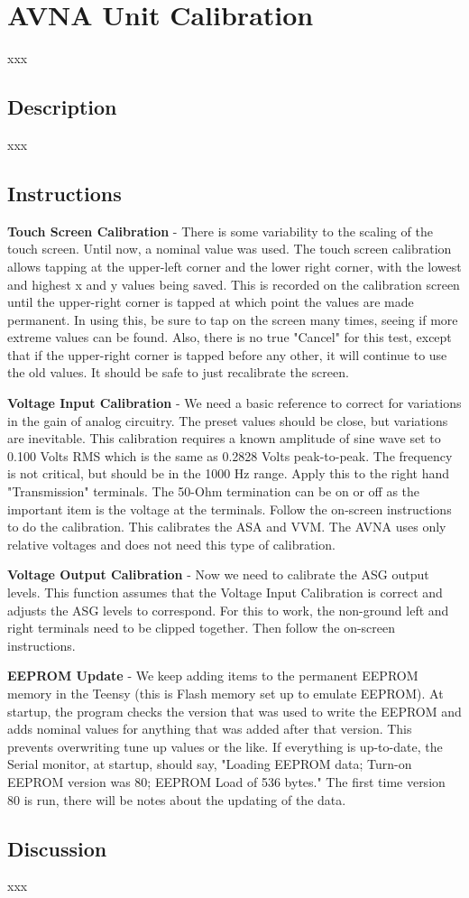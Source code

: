 \section{AVNA Unit Calibration}
xxx
\subsection{Description}
xxx
\subsection{Instructions}
\textbf{Touch Screen Calibration} - There is some variability to the scaling of the touch screen.  Until now, a nominal value was used.  The touch screen calibration allows tapping at the upper-left corner and the lower right corner, with the lowest and highest x and y values being saved.  This is recorded on the calibration screen until the upper-right corner is tapped at which point the values are made permanent.  In using this, be sure to tap on the screen many times, seeing if more extreme values can be found.  Also, there is no true "Cancel" for this test, except that if the upper-right corner is tapped before any  other, it will continue to use the old values.  It should be safe to just recalibrate the screen.

\textbf{Voltage Input Calibration} - We need a basic reference to correct for variations in the gain of analog circuitry.  The preset values should be close, but variations are inevitable.  This calibration requires a known amplitude of sine wave set to 0.100 Volts RMS which is the same as 0.2828 Volts peak-to-peak. The frequency is not critical, but should be in the 1000 Hz range.  Apply this to the right hand "Transmission" terminals.  The 50-Ohm termination can be on or off as the important item is the voltage at the terminals.  Follow the on-screen instructions to do the calibration.  This calibrates the ASA and VVM. The AVNA uses only relative voltages and does not need this type of calibration.

\textbf{Voltage Output Calibration} - Now we need to calibrate the ASG output levels.  This function assumes that the Voltage Input Calibration is correct and adjusts the ASG levels to correspond.  For this to work, the non-ground left and right terminals need to be clipped together.  Then follow the on-screen instructions.

\textbf{EEPROM Update} - We keep adding items to the permanent EEPROM memory in the Teensy (this is Flash memory set up to emulate EEPROM).  At startup, the program checks the version that was used to write the EEPROM and adds nominal values for anything that was added after that version.  This prevents overwriting tune up values or the like.  If everything is up-to-date, the Serial monitor, at startup, should say, "Loading EEPROM data; Turn-on EEPROM version was 80; EEPROM Load of 536 bytes."  The first time version 80 is run, there will be notes about the updating of the data.

\subsection{Discussion}
xxx

